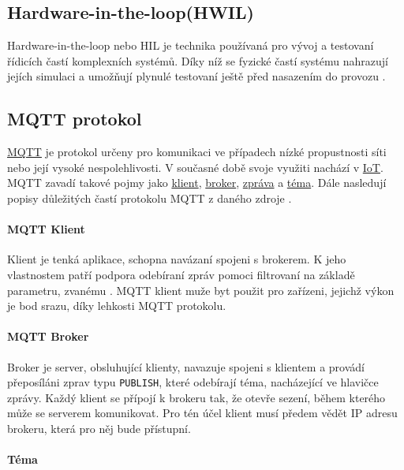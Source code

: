 \subsection{Hardware-in-the-loop(HWIL)}
\label{subsec:hwil}

Hardware-in-the-loop nebo HIL je technika používaná pro vývoj a testovaní řídicích častí komplexních systémů. Díky níž se fyzické častí systému nahrazují jejích simulaci a umožňují plynulé testovaní ještě před nasazením do provozu \cite{hil}.

\subsection{MQTT protokol}
\label{subsec:mqtt-proto}

\href{http://mqtt.org/}{MQTT} je protokol určeny pro komunikaci ve případech nízké propustnosti síti nebo její vysoké nespolehlivosti. V současné době svoje využiti nachází v \href{https://en.wikipedia.org/wiki/Internet_of_things}{IoT}. MQTT zavadí takové pojmy jako \hyperref[par:client]{klient}, \hyperref[par:broker]{broker}, \hyperref[par:message]{zpráva} a \hyperref[par:topic]{téma}. Dále nasledují popisy důležitých častí protokolu MQTT z daného zdroje \cite{mqtt}.

\paragraph{MQTT Klient}
\label{par:client}

Klient je tenká aplikace, schopna navázaní spojeni s brokerem. K jeho vlastnostem patří podpora odebíraní zpráv pomoci filtrovaní na základě parametru, zvanému \hyperref[par:topic]{}. MQTT klient muže byt použit pro zařízeni, jejichž výkon je bod srazu, díky lehkosti MQTT protokolu.

\paragraph{MQTT Broker}
\label{par:broker}

Broker je server, obsluhující klienty, navazuje spojeni s klientem a provádí přeposíláni zprav typu \texttt{PUBLISH}, které odebírají téma, nacházející ve hlavičce zprávy. Každý klient se přípojí k brokeru tak, že otevře sezení, během kterého může se serverem komunikovat. Pro tén účel klient musí předem vědět IP adresu brokeru, která pro něj bude přístupní.

\paragraph{Téma}
\label{par:topic}


